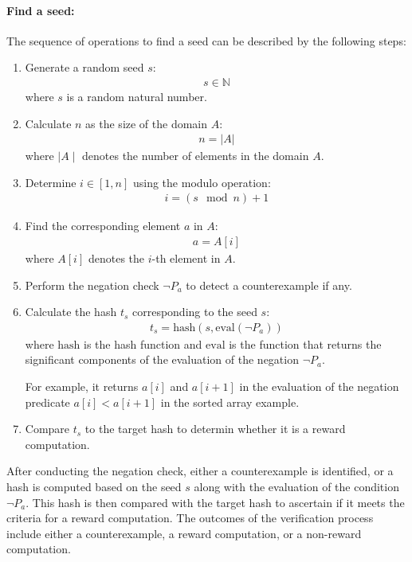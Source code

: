 \documentclass[runningheads]{llncs}
\begin{document}
\paragraph{Find a seed:}
The sequence of operations to find a seed can be described by the following steps:
\begin{enumerate}
\item Generate a random seed $s$: 
\begin{align}
s \in \mathbb{N} 
\end{align}
where $s$ is a random natural number.
\item Calculate $n$ as the size of the domain $A$: 
\begin{align}
n = |A|
\end{align}
where $\mid A \mid$ denotes the number of elements in the domain $A$.
\item Determine $i \in [1, n]$ using the modulo operation:
\begin{align}
i = (s \mod n) + 1
\end{align}
\item Find the corresponding element $a$ in $A$:
\begin{align}
a=A[i]
\end{align}
where $A[i]$ denotes the $i$-th element in $A$.
\item Perform the negation check $\neg P_{a}$ to detect a counterexample if any.

\item Calculate the hash \( t_s \) corresponding to the seed \( s \):
\begin{align}
t_s = \text{hash}(s, \text{eval}(\neg P_{a}))
\end{align}
where \(\text{hash}\) is the hash function and \(\text{eval}\) is the function that returns the significant components of the evaluation of the negation \(\neg P_{a}\). 

For example, it returns \(a[i]\) and \(a[i + 1]\) in the evaluation of the negation predicate \(a[i] < a[i+1]\) in the sorted array example.
\item Compare \( t_s \) to the target hash to determin whether it is a reward computation.
\end{enumerate}



After conducting the negation check, either a counterexample is identified, or a hash is computed based on the seed $s$ along with the evaluation of the condition $\neg P_{a}$. This hash is then compared with the target hash to ascertain if it meets the criteria for a reward computation. The outcomes of the verification process include either a counterexample, a reward computation, or a non-reward computation.
\end{document}

